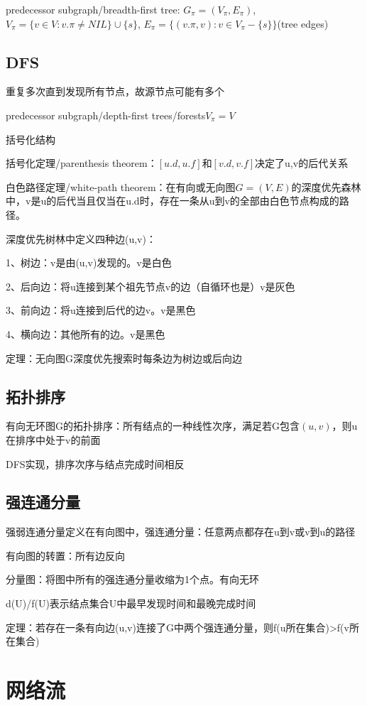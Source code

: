 \documentclass[cn,hazy,blue,screen,14pt]{note}
\begin{document}
predecessor subgraph/breadth-first tree: $G_{\pi}=(V_{\pi},E_{\pi})$, $V_{\pi}=\{v\in V:v.\pi\neq NIL\}\cup \{s\}$, $E_{\pi}=\{(v.\pi,v):v\in V_{\pi}-\{s\}\}$(tree edges)
\subsection{DFS}
重复多次直到发现所有节点，故源节点可能有多个

predecessor subgraph/depth-first trees/forests$V_{\pi}=V$

括号化结构

括号化定理/parenthesis theorem：$[u.d,u.f]$和$[v.d,v.f]$决定了u,v的后代关系

白色路径定理/white-path theorem：在有向或无向图$G=(V,E)$的深度优先森林中，v是u的后代当且仅当在u.d时，存在一条从u到v的全部由白色节点构成的路径。

深度优先树林中定义四种边(u,v)：

1、树边：v是由(u,v)发现的。v是白色

2、后向边：将u连接到某个祖先节点v的边（自循环也是）v是灰色

3、前向边：将u连接到后代的边v。v是黑色

4、横向边：其他所有的边。v是黑色

定理：无向图G深度优先搜索时每条边为树边或后向边

\subsection{拓扑排序}
有向无环图G的拓扑排序：所有结点的一种线性次序，满足若G包含$(u,v)$，则u在排序中处于v的前面

DFS实现，排序次序与结点完成时间相反

\subsection{强连通分量}
强弱连通分量定义在有向图中，强连通分量：任意两点都存在u到v或v到u的路径

有向图的转置：所有边反向

分量图：将图中所有的强连通分量收缩为1个点。有向无环

d(U)/f(U)表示结点集合U中最早发现时间和最晚完成时间

定理：若存在一条有向边(u,v)连接了G中两个强连通分量，则f(u所在集合)>f(v所在集合)

\newpage
\section{网络流}
\end{document}
